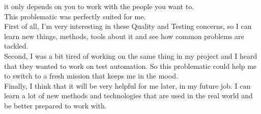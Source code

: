 it only depends on you to work with the people you want to. \\
\newline
This problematic was perfectly suited for me. \\
First of all, I'm very interesting in these Quality and Testing concerns,
so I can learn new things, methods, tools about it and see how common
problems are tackled. \\
Second, I was a bit tired of working on the same thing in my project and
I heard that they wanted to work on test automation.
So this problematic could help me to switch to a fresh mission that keeps
me in the mood. \\
Finally, I think that it will be very helpful for me later, in my future
job.
I can learn a lot of new methods and technologies that are used in the
real world and be better prepared to work with.

